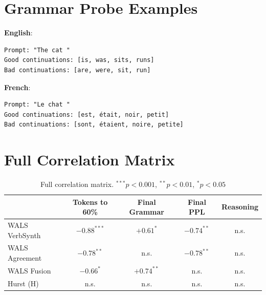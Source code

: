 \documentclass[11pt]{article}
\begin{document}



\appendix

\section{Grammar Probe Examples}

\textbf{English}:
\begin{verbatim}
Prompt: "The cat "
Good continuations: [is, was, sits, runs]
Bad continuations: [are, were, sit, run]
\end{verbatim}

\textbf{French}:
\begin{verbatim}
Prompt: "Le chat "
Good continuations: [est, était, noir, petit]
Bad continuations: [sont, étaient, noire, petite]
\end{verbatim}

\section{Full Correlation Matrix}

\begin{table}[h]
\centering
\small
\begin{tabular}{lcccc}
\toprule
& Tokens to 60\% & Final Grammar & Final PPL & Reasoning \\
\midrule
WALS VerbSynth & $-0.88^{***}$ & $+0.61^{*}$ & $-0.74^{**}$ & n.s. \\
WALS Agreement & $-0.78^{**}$ & n.s. & $-0.78^{**}$ & n.s. \\
WALS Fusion & $-0.66^{*}$ & $+0.74^{**}$ & n.s. & n.s. \\
Hurst (H) & n.s. & n.s. & n.s. & n.s. \\
\bottomrule
\end{tabular}
\caption{Full correlation matrix. $^{***}p<0.001$, $^{**}p<0.01$, $^{*}p<0.05$}
\end{table}
\end{document}
